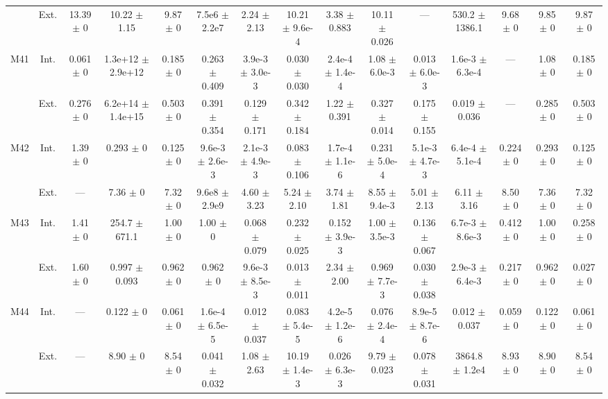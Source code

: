 \begin{table}[htbp]
{\begin{tabular}{@{}ccccccccccccccc@{}}
 & Ext. & 13.39 $\pm$ 0 & 10.22 $\pm$ 1.15 & 9.87 $\pm$ 0 & 7.5e6 $\pm$ 2.2e7 & 2.24 $\pm$ 2.13 & 10.21 $\pm$ 9.6e-4 & 3.38 $\pm$ 0.883 & 10.11 $\pm$ 0.026 & --- & 530.2 $\pm$ 1386.1 & 9.68 $\pm$ 0 & 9.85 $\pm$ 0 & 9.87 $\pm$ 0 \\
\cline{2-15}
\multirow{2}{*}{M41} & Int. & 0.061 $\pm$ 0 & 1.3e+12 $\pm$ 2.9e+12 & 0.185 $\pm$ 0 & 0.263 $\pm$ 0.409 & 3.9e-3 $\pm$ 3.0e-3 & 0.030 $\pm$ 0.030 & 2.4e-4 $\pm$ 1.4e-4 & 1.08 $\pm$ 6.0e-3 & 0.013 $\pm$ 6.0e-3 & 1.6e-3 $\pm$ 6.3e-4 & --- & 1.08 $\pm$ 0 & 0.185 $\pm$ 0 \\
 & Ext. & 0.276 $\pm$ 0 & 6.2e+14 $\pm$ 1.4e+15 & 0.503 $\pm$ 0 & 0.391 $\pm$ 0.354 & 0.129 $\pm$ 0.171 & 0.342 $\pm$ 0.184 & 1.22 $\pm$ 0.391 & 0.327 $\pm$ 0.014 & 0.175 $\pm$ 0.155 & 0.019 $\pm$ 0.036 & --- & 0.285 $\pm$ 0 & 0.503 $\pm$ 0 \\
\cline{2-15}
\multirow{2}{*}{M42} & Int. & 1.39 $\pm$ 0 & 0.293 $\pm$ 0 & 0.125 $\pm$ 0 & 9.6e-3 $\pm$ 2.6e-3 & 2.1e-3 $\pm$ 4.9e-3 & 0.083 $\pm$ 0.106 & 1.7e-4 $\pm$ 1.1e-6 & 0.231 $\pm$ 5.0e-4 & 5.1e-3 $\pm$ 4.7e-3 & 6.4e-4 $\pm$ 5.1e-4 & 0.224 $\pm$ 0 & 0.293 $\pm$ 0 & 0.125 $\pm$ 0 \\
 & Ext. & --- & 7.36 $\pm$ 0 & 7.32 $\pm$ 0 & 9.6e8 $\pm$ 2.9e9 & 4.60 $\pm$ 3.23 & 5.24 $\pm$ 2.10 & 3.74 $\pm$ 1.81 & 8.55 $\pm$ 9.4e-3 & 5.01 $\pm$ 2.13 & 6.11 $\pm$ 3.16 & 8.50 $\pm$ 0 & 7.36 $\pm$ 0 & 7.32 $\pm$ 0 \\
\cline{2-15}
\multirow{2}{*}{M43} & Int. & 1.41 $\pm$ 0 & 254.7 $\pm$ 671.1 & 1.00 $\pm$ 0 & 1.00 $\pm$ 0 & 0.068 $\pm$ 0.079 & 0.232 $\pm$ 0.025 & 0.152 $\pm$ 3.9e-3 & 1.00 $\pm$ 3.5e-3 & 0.136 $\pm$ 0.067 & 6.7e-3 $\pm$ 8.6e-3 & 0.412 $\pm$ 0 & 1.00 $\pm$ 0 & 0.258 $\pm$ 0 \\
 & Ext. & 1.60 $\pm$ 0 & 0.997 $\pm$ 0.093 & 0.962 $\pm$ 0 & 0.962 $\pm$ 0 & 9.6e-3 $\pm$ 8.5e-3 & 0.013 $\pm$ 0.011 & 2.34 $\pm$ 2.00 & 0.969 $\pm$ 7.7e-3 & 0.030 $\pm$ 0.038 & 2.9e-3 $\pm$ 6.4e-3 & 0.217 $\pm$ 0 & 0.962 $\pm$ 0 & 0.027 $\pm$ 0 \\
\cline{2-15}
\multirow{2}{*}{M44} & Int. & --- & 0.122 $\pm$ 0 & 0.061 $\pm$ 0 & 1.6e-4 $\pm$ 6.5e-5 & 0.012 $\pm$ 0.037 & 0.083 $\pm$ 5.4e-5 & 4.2e-5 $\pm$ 1.2e-6 & 0.076 $\pm$ 2.4e-4 & 8.9e-5 $\pm$ 8.7e-6 & 0.012 $\pm$ 0.037 & 0.059 $\pm$ 0 & 0.122 $\pm$ 0 & 0.061 $\pm$ 0 \\
 & Ext. & --- & 8.90 $\pm$ 0 & 8.54 $\pm$ 0 & 0.041 $\pm$ 0.032 & 1.08 $\pm$ 2.63 & 10.19 $\pm$ 1.4e-3 & 0.026 $\pm$ 6.3e-3 & 9.79 $\pm$ 0.023 & 0.078 $\pm$ 0.031 & 3864.8 $\pm$ 1.2e4 & 8.93 $\pm$ 0 & 8.90 $\pm$ 0 & 8.54 $\pm$ 0 \\

\end{tabular}}
\end{table}
